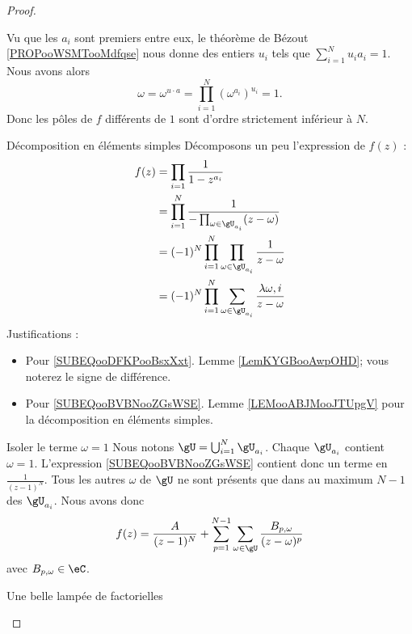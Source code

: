 \begin{proof}
\begin{subproof}
        Vu que les \( a_i\) sont premiers entre eux, le théorème de Bézout \ref{PROPooWSMTooMdfqse} nous donne des entiers \( u_i\) tels que \( \sum_{i=1}^Nu_ia_i=1\). Nous avons alors
        \begin{equation}
            \omega=\omega^{u\cdot a}=\prod_{i=1}^N(\omega^{a_i})^{u_i}=1.
        \end{equation}
        Donc les pôles de \( f\) différents de \( 1\) sont d'ordre strictement inférieur à \( N\).
    \item[Décomposition en éléments simples]
        Décomposons un peu l'expression de \( f(z)\) :
        \begin{subequations}
            \begin{align}
                f(z)&=\prod_{i=1}\frac{1}{ 1-z^{a_i} }\\
                &=\prod_{i=1}^N\frac{1}{ -\prod_{\omega\in \gU_{a_i}}(z-\omega) }     \label{SUBEQooDFKPooBsxXxt}     \\
                &=(-1)^N\prod_{i=1}^{N}\prod_{\omega\in \gU_{a_i}}\frac{1}{ z-\omega }\\
                &=(-1)^N\prod_{i=1}^N\sum_{\omega\in \gU_{a_i}}\frac{ \lambda{\omega,i} }{ z-\omega }   \label{SUBEQooBVBNooZGsWSE}
            \end{align}
        \end{subequations}
        Justifications :
        \begin{itemize}
            \item Pour \eqref{SUBEQooDFKPooBsxXxt}. Lemme \ref{LemKYGBooAwpOHD}; vous noterez le signe de différence.
            \item Pour \eqref{SUBEQooBVBNooZGsWSE}. Lemme \ref{LEMooABJMooJTUpgV} pour la décomposition en éléments simples.
        \end{itemize}
    \item[Isoler le terme \( \omega=1\)]
        Nous notons \( \gU=\bigcup_{i=1}^N\gU_{a_i}\). Chaque \( \gU_{a_i}\) contient \( \omega=1\). L'expression \eqref{SUBEQooBVBNooZGsWSE} contient donc un terme en \( \frac{1}{ (z-1)^N }\). Tous les autres \( \omega\) de \( \gU\) ne sont présents que dans au maximum \( N-1\) des \( \gU_{a_i}\). Nous avons donc
        \begin{equation}        \label{EQooUUEPooQrVASA}
            f(z)=\frac{ A }{ (z-1)^N }+\sum_{p=1}^{N-1}\sum_{\omega\in \gU}\frac{ B_{p,\omega} }{ (z-\omega)^p }
        \end{equation}
        avec \( B_{p,\omega}\in \eC\).
    \item[Une belle lampée de factorielles]

\end{subproof}
\end{proof}
